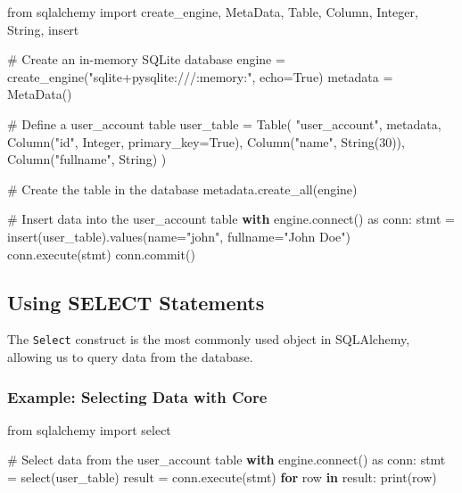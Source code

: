 \documentclass[
  letterpaper,
  DIV=11,
  numbers=noendperiod]{scrreprt}
\newenvironment{Shaded}{\begin{snugshade}}{\end{snugshade}}
\newcommand{\BuiltInTok}[1]{\textcolor[rgb]{0.00,0.23,0.31}{#1}}
\newcommand{\CommentTok}[1]{\textcolor[rgb]{0.37,0.37,0.37}{#1}}
\newcommand{\ControlFlowTok}[1]{\textcolor[rgb]{0.00,0.23,0.31}{\textbf{#1}}}
\newcommand{\DecValTok}[1]{\textcolor[rgb]{0.68,0.00,0.00}{#1}}
\newcommand{\ExtensionTok}[1]{\textcolor[rgb]{0.00,0.23,0.31}{#1}}
\newcommand{\ImportTok}[1]{\textcolor[rgb]{0.00,0.46,0.62}{#1}}
\newcommand{\KeywordTok}[1]{\textcolor[rgb]{0.00,0.23,0.31}{\textbf{#1}}}
\newcommand{\NormalTok}[1]{\textcolor[rgb]{0.00,0.23,0.31}{#1}}
\newcommand{\OperatorTok}[1]{\textcolor[rgb]{0.37,0.37,0.37}{#1}}
\newcommand{\StringTok}[1]{\textcolor[rgb]{0.13,0.47,0.30}{#1}}
\newcommand{\VariableTok}[1]{\textcolor[rgb]{0.07,0.07,0.07}{#1}}
\begin{document}
\begin{Shaded}
\begin{Highlighting}[]
\ImportTok{from}\NormalTok{ sqlalchemy }\ImportTok{import}\NormalTok{ create\_engine, MetaData, Table, Column, Integer, String, insert}

\CommentTok{\# Create an in{-}memory SQLite database}
\NormalTok{engine }\OperatorTok{=}\NormalTok{ create\_engine(}\StringTok{"sqlite+pysqlite:///:memory:"}\NormalTok{, echo}\OperatorTok{=}\VariableTok{True}\NormalTok{)}
\NormalTok{metadata }\OperatorTok{=}\NormalTok{ MetaData()}

\CommentTok{\# Define a user\_account table}
\NormalTok{user\_table }\OperatorTok{=}\NormalTok{ Table(}
    \StringTok{"user\_account"}\NormalTok{, metadata,}
\NormalTok{    Column(}\StringTok{"id"}\NormalTok{, Integer, primary\_key}\OperatorTok{=}\VariableTok{True}\NormalTok{),}
\NormalTok{    Column(}\StringTok{"name"}\NormalTok{, String(}\DecValTok{30}\NormalTok{)),}
\NormalTok{    Column(}\StringTok{"fullname"}\NormalTok{, String)}
\NormalTok{)}

\CommentTok{\# Create the table in the database}
\NormalTok{metadata.create\_all(engine)}

\CommentTok{\# Insert data into the user\_account table}
\ControlFlowTok{with}\NormalTok{ engine.}\ExtensionTok{connect}\NormalTok{() }\ImportTok{as}\NormalTok{ conn:}
\NormalTok{    stmt }\OperatorTok{=}\NormalTok{ insert(user\_table).values(name}\OperatorTok{=}\StringTok{"john"}\NormalTok{, fullname}\OperatorTok{=}\StringTok{"John Doe"}\NormalTok{)}
\NormalTok{    conn.execute(stmt)}
\NormalTok{    conn.commit()}
\end{Highlighting}
\end{Shaded}

\subsection{Using SELECT Statements}\label{using-select-statements}

The \texttt{Select} construct is the most commonly used object in
SQLAlchemy, allowing us to query data from the database.

\subsubsection{Example: Selecting Data with
Core}\label{example-selecting-data-with-core}

\begin{Shaded}
\begin{Highlighting}[]
\ImportTok{from}\NormalTok{ sqlalchemy }\ImportTok{import}\NormalTok{ select}

\CommentTok{\# Select data from the user\_account table}
\ControlFlowTok{with}\NormalTok{ engine.}\ExtensionTok{connect}\NormalTok{() }\ImportTok{as}\NormalTok{ conn:}
\NormalTok{    stmt }\OperatorTok{=}\NormalTok{ select(user\_table)}
\NormalTok{    result }\OperatorTok{=}\NormalTok{ conn.execute(stmt)}
    \ControlFlowTok{for}\NormalTok{ row }\KeywordTok{in}\NormalTok{ result:}
        \BuiltInTok{print}\NormalTok{(row)}
\end{Highlighting}
\end{Shaded}
\end{document}
